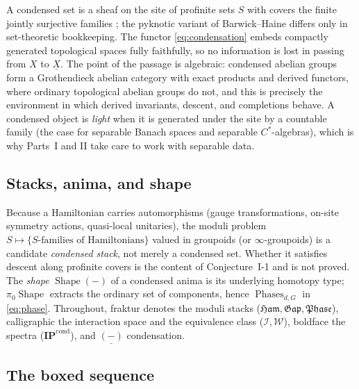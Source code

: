 \documentclass[12pt]{article}
\newcommand{\cond}[1]{\underline{#1}}          %
\newcommand{\Shape}{\operatorname{Shape}}      %
\newcommand{\Int}{\mathcal{I}}                 %
\newcommand{\Ham}{\mathfrak{Ham}}              %
\newcommand{\Gap}{\mathfrak{Gap}}              %
\newcommand{\Phase}{\mathfrak{Phase}}          %
\newcommand{\Phases}{\operatorname{Phases}}    %
\newcommand{\Weq}{\mathcal{W}}                 %
\newcommand{\IPcond}{\mathbf{IP}^{\mathrm{cond}}}  %
\theoremstyle{plain}
\theoremstyle{definition}
\theoremstyle{remark}
\begin{document}
A condensed set is a sheaf on the site of profinite sets $S$ with covers the finite
jointly surjective families \cite{clausen-scholze-condensed}; the pyknotic variant of
Barwick--Haine \cite{barwick-haine-pyknotic} differs only in set-theoretic
bookkeeping. The functor \eqref{eq:condensation} embeds compactly generated topological
spaces fully faithfully, so no information is lost in passing from $X$ to $\cond{X}$.
The point of the passage is algebraic: condensed abelian groups form a Grothendieck
abelian category with exact products and derived functors, where ordinary topological
abelian groups do not, and this is precisely the environment in which derived
invariants, descent, and completions behave. A condensed object is \emph{light} when it
is generated under the site by a countable family (the case for separable Banach spaces
and separable $C^\ast$-algebras), which is why Parts~I and II take care to work with
separable data.

\subsection{Stacks, anima, and shape}

Because a Hamiltonian carries automorphisms (gauge transformations, on-site symmetry
actions, quasi-local unitaries), the moduli problem $S\mapsto\{S\text{-families of
Hamiltonians}\}$ valued in groupoids (or $\infty$-groupoids) is a candidate
\emph{condensed stack}, not merely a condensed set. Whether it satisfies descent along
profinite covers is the content of Conjecture~I-1 and is not proved. The \emph{shape}
$\Shape(-)$ of a condensed anima is its underlying homotopy type; $\pi_0\Shape$
extracts the ordinary set of components, hence $\Phases_{d,G}$ in \eqref{eq:phase}.
Throughout, fraktur denotes the moduli stacks ($\Ham,\Gap,\Phase$), calligraphic the
interaction space and the equivalence class ($\Int,\Weq$), boldface the spectra
($\IPcond$), and $\cond{(-)}$ condensation.

\subsection{The boxed sequence}
\end{document}
